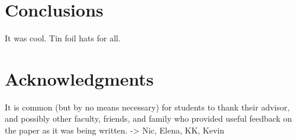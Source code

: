\documentclass{sig-alternate}
\begin{document}
\section{Conclusions}
\label{sec:conclusions}

It was cool. Tin foil hats for all.

\section*{Acknowledgments}
\label{sec:acknowledgments}


It is common (but by no means necessary) for students to thank
their advisor, and possibly other faculty, friends, and family who provided
useful feedback on the paper as it was being written. -> Nic, Elena, KK, Kevin


  
\end{document}
